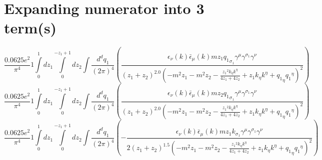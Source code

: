 \section*{Expanding numerator into 3 term(s)}
\begin{dmath}\frac{0.0625 e^{2}}{\pi^{4}}1\int\limits_{ 0 }^{ 1 } d{ z_{ 1 } }\int\limits_{ 0 }^{ - { z_{ 1 } } + 1 } d{ z_{ 2 } }\int\frac{d^d q_1 }{ (2\pi)^4 }\left(\frac{\epsilon_{ \nu }({ k }) \bar{\epsilon}_{ \mu }({ k }) m { z_{ 1 } } { { q_1 }_{ \sigma_1 } } { \gamma^{ \mu } } { \gamma^{ \sigma_1 } } { \gamma^{ \nu } }}{\left({ z_{ 1 } } + { z_{ 2 } }\right)^{2.0} \left(- m^{2} { z_{ 1 } } - m^{2} { z_{ 2 } } - \frac{{ z_{ 1 } }^{2} { { k }_{ \eta } } { { k }^{ \eta } }}{4 { z_{ 1 } } + 4 { z_{ 2 } }} + { z_{ 1 } } { { k }_{ \eta } } { { k }^{ \eta } } + { { q_1 }_{ \eta } } { { q_1 }^{ \eta } }\right)^{2}}\right)\end{dmath}
\begin{dmath}\frac{0.0625 e^{2}}{\pi^{4}}1\int\limits_{ 0 }^{ 1 } d{ z_{ 1 } }\int\limits_{ 0 }^{ - { z_{ 1 } } + 1 } d{ z_{ 2 } }\int\frac{d^d q_1 }{ (2\pi)^4 }\left(\frac{\epsilon_{ \nu }({ k }) \bar{\epsilon}_{ \mu }({ k }) m { z_{ 2 } } { { q_1 }_{ \sigma_1 } } { \gamma^{ \mu } } { \gamma^{ \sigma_1 } } { \gamma^{ \nu } }}{\left({ z_{ 1 } } + { z_{ 2 } }\right)^{2.0} \left(- m^{2} { z_{ 1 } } - m^{2} { z_{ 2 } } - \frac{{ z_{ 1 } }^{2} { { k }_{ \eta } } { { k }^{ \eta } }}{4 { z_{ 1 } } + 4 { z_{ 2 } }} + { z_{ 1 } } { { k }_{ \eta } } { { k }^{ \eta } } + { { q_1 }_{ \eta } } { { q_1 }^{ \eta } }\right)^{2}}\right)\end{dmath}
\begin{dmath}\frac{0.0625 e^{2}}{\pi^{4}}1\int\limits_{ 0 }^{ 1 } d{ z_{ 1 } }\int\limits_{ 0 }^{ - { z_{ 1 } } + 1 } d{ z_{ 2 } }\int\frac{d^d q_1 }{ (2\pi)^4 }\left(- \frac{\epsilon_{ \nu }({ k }) \bar{\epsilon}_{ \mu }({ k }) m { z_{ 1 } } { { k }_{ \sigma_1 } } { \gamma^{ \mu } } { \gamma^{ \sigma_1 } } { \gamma^{ \nu } }}{2 \left({ z_{ 1 } } + { z_{ 2 } }\right)^{1.5} \left(- m^{2} { z_{ 1 } } - m^{2} { z_{ 2 } } - \frac{{ z_{ 1 } }^{2} { { k }_{ \eta } } { { k }^{ \eta } }}{4 { z_{ 1 } } + 4 { z_{ 2 } }} + { z_{ 1 } } { { k }_{ \eta } } { { k }^{ \eta } } + { { q_1 }_{ \eta } } { { q_1 }^{ \eta } }\right)^{2}}\right)\end{dmath}
